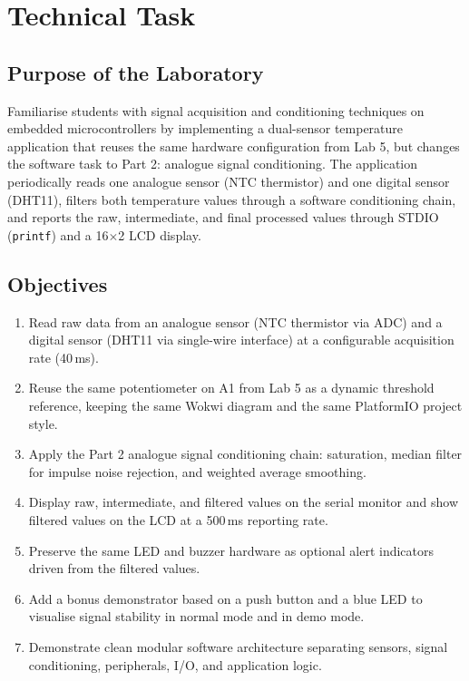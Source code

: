 \documentclass[12pt]{article}
\begin{document}
\section*{Technical Task}

\subsection*{Purpose of the Laboratory}
\hspace{0.8cm} Familiarise students with signal acquisition and conditioning techniques on embedded microcontrollers by implementing a dual-sensor temperature application that reuses the same hardware configuration from Lab 5, but changes the software task to Part 2: analogue signal conditioning. The application periodically reads one analogue sensor (NTC thermistor) and one digital sensor (DHT11), filters both temperature values through a software conditioning chain, and reports the raw, intermediate, and final processed values through STDIO (\texttt{printf}) and a 16$\times$2 LCD display.

\subsection*{Objectives}
\begin{enumerate}
    \item Read raw data from an analogue sensor (NTC thermistor via ADC) and a digital sensor (DHT11 via single-wire interface) at a configurable acquisition rate (40\,ms).
    \item Reuse the same potentiometer on A1 from Lab 5 as a dynamic threshold reference, keeping the same Wokwi diagram and the same PlatformIO project style.
    \item Apply the Part 2 analogue signal conditioning chain: saturation, median filter for impulse noise rejection, and weighted average smoothing.
    \item Display raw, intermediate, and filtered values on the serial monitor and show filtered values on the LCD at a 500\,ms reporting rate.
    \item Preserve the same LED and buzzer hardware as optional alert indicators driven from the filtered values.
    \item Add a bonus demonstrator based on a push button and a blue LED to visualise signal stability in normal mode and in demo mode.
    \item Demonstrate clean modular software architecture separating sensors, signal conditioning, peripherals, I/O, and application logic.
\end{enumerate}
\end{document}
